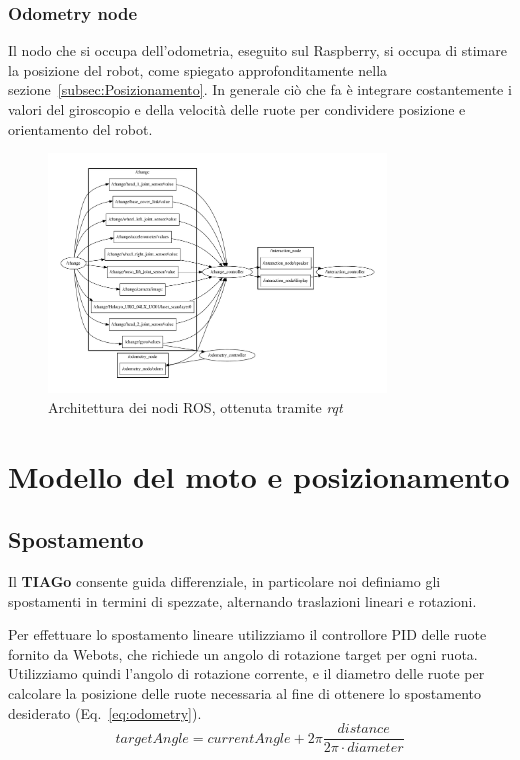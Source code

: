 \documentclass[a4paper]{article}
\begin{document}
	\subsubsection{Odometry node}\label{subsubsec:Odometry-node}
	Il nodo che si occupa dell'odometria, eseguito sul Raspberry, si occupa di stimare la posizione del
	robot, come spiegato approfonditamente nella
	sezione~\ref{subsec:Posizionamento}. In generale ciò che fa è integrare
	costantemente i valori del giroscopio e della velocità delle ruote per
	condividere posizione e orientamento del robot.
	 

	\begin{figure}[H]
		\centering
		\includegraphics[width=0.8\textwidth]{img/rosgraph.pdf}
		\caption{Architettura dei nodi ROS, ottenuta tramite \textit{rqt}}
		\label{fig:rosgraph}
	\end{figure}
	

	\section{Modello del moto e posizionamento}\label{sec:Modello-del-moto-e-posizionamento} 

	\subsection{Spostamento}\label{subsec:Spostamento}

	Il \textbf{TIAGo} consente guida differenziale, in particolare noi
	definiamo gli spostamenti in termini di spezzate, alternando traslazioni
	lineari e rotazioni.

	Per effettuare lo spostamento lineare utilizziamo il controllore PID delle
	ruote fornito da Webots, che richiede un angolo di rotazione target per
	ogni ruota. Utilizziamo quindi l'angolo di rotazione corrente, e il
	diametro delle ruote per calcolare la posizione delle ruote necessaria al
	fine di ottenere lo spostamento desiderato (Eq.~\ref{eq:odometry}).
	\begin{equation}\label{eq:odometry}
	targetAngle =
	currentAngle+2\pi\frac    {distance}
					{2\pi \cdot diameter}
	\end{equation}
\end{document}
